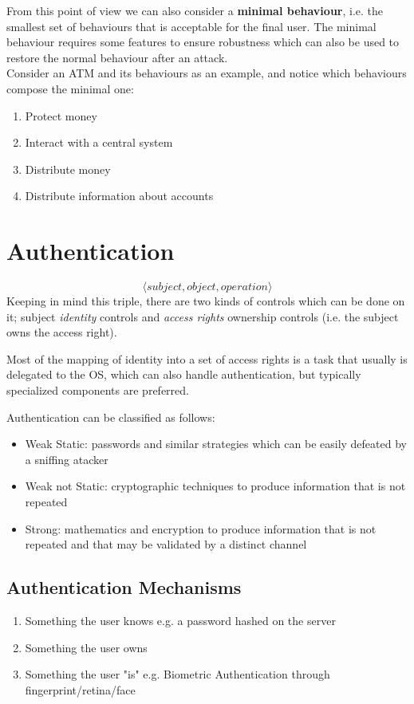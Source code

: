 From this point of view we can also consider a \textbf{minimal behaviour},
i.e. the smallest set of behaviours that is acceptable for the final user.
The minimal behaviour requires some features to ensure robustness which can also be used to restore the normal behaviour after an attack.\\
Consider an ATM and its behaviours as an example, and notice which behaviours compose the {\color{red} minimal} one:
\begin{enumerate}
    \item {\color{red} Protect money}
    \item {\color{red} Interact with a central system}
    \item Distribute money
    \item Distribute information about accounts
\end{enumerate}

\section{Authentication}
\[\langle subject, object, operation \rangle\]
Keeping in mind this triple, there are two kinds of controls which can be done on it; subject \textit{identity} controls and \textit{access rights} ownership controls (i.e. the subject owns the access right).

Most of the mapping of identity into a set of access rights is a task that usually is delegated to the OS,
which can also handle authentication,
but typically specialized components are preferred.

Authentication can be classified as follows:
\begin{itemize}
    \item Weak Static: passwords and similar strategies which can be easily defeated by a sniffing atacker
    \item Weak not Static: cryptographic techniques to produce information that is not repeated
    \item Strong: mathematics and encryption to produce information
    that is not repeated and that may be validated by a distinct
    channel
\end{itemize}

\subsection{Authentication Mechanisms}
\begin{enumerate}
    \item Something the user knows e.g. a password hashed on the server
    \item Something the user owns
    \item Something the user "is" e.g. Biometric Authentication through fingerprint/retina/face
\end{enumerate}

